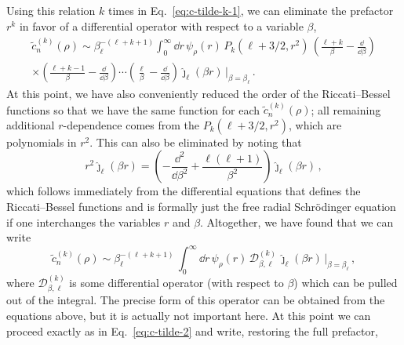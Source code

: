  Using this relation $k$ times in Eq.~\eqref{eq:c-tilde-k-1}, we can eliminate
  the prefactor $r^k$ in favor of a differential operator with respect to a
  variable $\beta$,
  \begin{multline}
   \tilde{c}_n^{(k)}(\rho) \sim \beta_\ell^{-(\ell+k+1)}
   \int_0^\infty\dd r\,\psi_\rho(r)\,  P_k(\ell+3/2,r^2)\,
   \left(\frac{\ell+k}{\beta}-\frac{\dd}{\dd\beta}\right) \\
   \times
   \left(\frac{\ell+k-1}{\beta}-\frac{\dd}{\dd\beta}\right)
   \cdots\left(\frac{\ell}{\beta}-\frac{\dd}{\dd\beta}\right)
   \hat\jmath_{\ell}(\beta r)\,\Big|_{\beta=\beta_\ell} \,.
  \label{eq:c-tilde-k-1b}
  \end{multline}
  At this point, we have also conveniently reduced the order of
  the Riccati--Bessel functions so that we have the same function for each
  $\tilde{c}_n^{(k)}(\rho)$; all remaining additional $r$-dependence comes from
  the $P_k(\ell+3/2,r^2)$, which are polynomials in $r^2$.  This can also be
  eliminated by noting that
  \begin{equation}
   r^2 \hat\jmath_\ell(\beta r) = \left(-\frac{\dd^2}{\dd\beta^2}
   +\frac{\ell(\ell+1)}{\beta^2}\right)\hat\jmath_\ell(\beta r) \,,
  \label{eq:r2-j-hat}
  \end{equation}
  which follows immediately from the differential equations that defines
  the Riccati--Bessel functions and is formally just the free radial
  Schrödinger equation if one interchanges the variables $r$ and $\beta$.
  Altogether, we have found that we can write
  \begin{equation}
   \tilde{c}_n^{(k)}(\rho) \sim \beta_\ell^{-(\ell+k+1)}\,
   \int_0^\infty\dd r\,\psi_\rho(r)\,\mathcal{D}_{\beta,\ell}^{(k)}\,
   \hat\jmath_{\ell}(\beta r)\,\Big|_{\beta=\beta_\ell} \,,
  \label{eq:c-tilde-k-1c}
  \end{equation}
  where $\mathcal{D}_{\beta,\ell}^{(k)}$ is some differential operator (with
  respect to $\beta$) which can be pulled out of the integral.  The precise
  form of this operator can be obtained from the equations above, but it is
  actually not important here.  At this point we can proceed exactly as in
  Eq.~\eqref{eq:c-tilde-2} and write, restoring the full prefactor,
